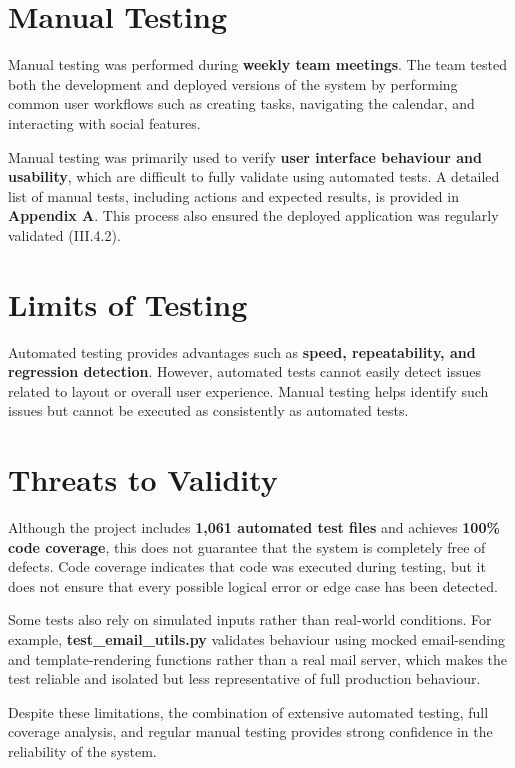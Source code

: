 \section{Manual Testing}

Manual testing was performed during \textbf{weekly team meetings}. The team tested both the development and deployed versions of the system by performing common user workflows such as creating tasks, navigating the calendar, and interacting with social features.

Manual testing was primarily used to verify \textbf{user interface behaviour and usability}, which are difficult to fully validate using automated tests. A detailed list of manual tests, including actions and expected results, is provided in \textbf{Appendix A}. This process also ensured the deployed application was regularly validated (III.4.2).

\section{Limits of Testing}

Automated testing provides advantages such as \textbf{speed, repeatability, and regression detection}. However, automated tests cannot easily detect issues related to layout or overall user experience. Manual testing helps identify such issues but cannot be executed as consistently as automated tests.

\section{Threats to Validity}

Although the project includes \textbf{1,061 automated test files} and achieves \textbf{100\% code coverage}, this does not guarantee that the system is completely free of defects. Code coverage indicates that code was executed during testing, but it does not ensure that every possible logical error or edge case has been detected.

Some tests also rely on simulated inputs rather than real-world conditions. For example, \textbf{test\_email\_utils.py} validates behaviour using mocked email-sending and template-rendering functions rather than a real mail server, which makes the test reliable and isolated but less representative of full production behaviour.

Despite these limitations, the combination of extensive automated testing, full coverage analysis, and regular manual testing provides strong confidence in the reliability of the system.
